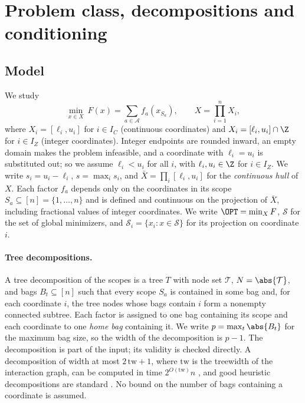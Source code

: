 \section{Problem class, decompositions and conditioning}\label{sec:setting}

\subsection{Model}
We study
\begin{equation}\label{eq:model}
\min_{x\in X}\ F(x)=\sum_{a\in\mathcal A}f_a(x_{S_a}),\qquad
X=\prod_{i=1}^nX_i ,
\end{equation}
where $X_i=[\ell_i,u_i]$ for $i\in I_C$ (continuous coordinates) and
$X_i=[\ell_i,u_i]\cap\Z$ for $i\in I_Z$ (integer coordinates). Integer
endpoints are rounded inward, an empty domain makes the problem infeasible,
and a coordinate with $\ell_i=u_i$ is substituted out; so we assume
$\ell_i<u_i$ for all $i$, with $\ell_i,u_i\in\Z$ for $i\in I_Z$. We write
$s_i=u_i-\ell_i$, $s=\max_is_i$, and $\bar X=\prod_i[\ell_i,u_i]$ for the
\emph{continuous hull} of $X$. Each factor $f_a$ depends only on the
coordinates in its scope $S_a\subseteq[n]=\{1,\dots,n\}$ and is defined and
continuous on the projection of $\bar X$, including fractional values of
integer coordinates. We write $\OPT=\min_XF$, $\mathcal S$ for the set of
global minimizers, and $\mathcal S_i=\{x_i:x\in\mathcal S\}$ for its
projection on coordinate $i$.

\paragraph{Tree decompositions.}
A tree decomposition of the scopes is a tree $T$ with node set $\mathcal T$,
$N=\abs{\mathcal T}$, and bags $B_t\subseteq[n]$ such that every scope $S_a$
is contained in some bag and, for each coordinate $i$, the tree nodes whose
bags contain $i$ form a nonempty connected subtree. Each factor is assigned
to one bag containing its scope and each coordinate to one \emph{home bag}
containing it. We write $p=\max_t\abs{B_t}$ for the maximum bag size, so the
width of the decomposition is $p-1$. The decomposition is part of the input;
its validity is checked directly. A decomposition of width at most
$2\,\mathrm{tw}+1$, where $\mathrm{tw}$ is the treewidth of the interaction
graph, can be computed in time $2^{O(\mathrm{tw})}n$ \cite{Korhonen2021}, and
good heuristic decompositions are standard \cite{BodlaenderKoster2010}. No bound
on the number of bags containing a coordinate is assumed.

